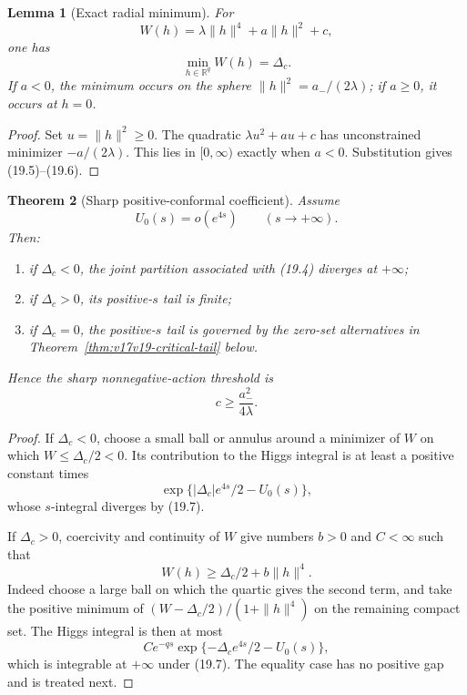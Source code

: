 \documentclass[11pt]{article}
\newtheorem{theorem}{Theorem}[section]
\newtheorem{lemma}[theorem]{Lemma}
\theoremstyle{remark}
\begin{document}
\begin{lemma}[Exact radial minimum]
\label{lem:v17v19-radial-minimum}
For
\[
 W(h)=\lambda\|h\|^4+a\|h\|^2+c,
\]
one has
\[
 \min_{h\in\mathbb R^q}W(h)=\Delta_c.              \tag{19.6}
\]
If \(a<0\), the minimum occurs on the sphere
\(\|h\|^2=a_-/(2\lambda)\); if \(a\geq0\), it occurs at \(h=0\).
\end{lemma}

\begin{proof}
Set \(u=\|h\|^2\geq0\).  The quadratic
\(\lambda u^2+au+c\) has unconstrained minimizer
\(-a/(2\lambda)\).  This lies in \([0,\infty)\) exactly when
\(a<0\).  Substitution gives (19.5)--(19.6).
\end{proof}

\begin{theorem}[Sharp positive-conformal coefficient]
\label{thm:v17v19-threshold}
Assume
\[
 U_0(s)=o(e^{4s})\qquad(s\to+\infty).              \tag{19.7}
\]
Then:
\begin{enumerate}
\item if \(\Delta_c<0\), the joint partition associated with
      (19.4) diverges at \(+\infty\);
\item if \(\Delta_c>0\), its positive-\(s\) tail is finite;
\item if \(\Delta_c=0\), the positive-\(s\) tail is governed by the
      zero-set alternatives in
      Theorem~\ref{thm:v17v19-critical-tail} below.
\end{enumerate}
Hence the sharp nonnegative-action threshold is
\[
 c\geq\frac{a_-^2}{4\lambda}.                      \tag{19.8}
\]
\end{theorem}

\begin{proof}
If \(\Delta_c<0\), choose a small ball or annulus around a minimizer
of \(W\) on which \(W\leq\Delta_c/2<0\).  Its contribution to the
Higgs integral is at least a positive constant times
\[
 \exp\{|\Delta_c|e^{4s}/2-U_0(s)\},
\]
whose \(s\)-integral diverges by (19.7).

If \(\Delta_c>0\), coercivity and continuity of \(W\) give numbers
\(b>0\) and \(C<\infty\) such that
\[
 W(h)\geq\Delta_c/2+b\|h\|^4.                     \tag{19.9}
\]
Indeed choose a large ball on which the quartic gives the second
term, and take the positive minimum of
\((W-\Delta_c/2)/(1+\|h\|^4)\) on the remaining compact set.
The Higgs integral is then at most
\[
 C e^{-qs}
 \exp\{-\Delta_c e^{4s}/2-U_0(s)\},
\]
which is integrable at \(+\infty\) under (19.7).
The equality case has no positive gap and is treated next.
\end{proof}
\end{document}
